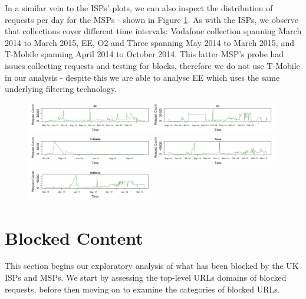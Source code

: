 \documentclass{bmcart}
\begin{document}
In a similar vein to the ISPs' plots, we can also inspect the distribution of requests per day for the MSPs - shown in Figure \ref{fig:mobile-requests}.
As with the ISPs, we observe that collections cover different time intervals: Vodafone collection spanning March 2014 to March 2015, EE, O2 and Three spanning May 2014 to March 2015, and T-Mobile spanning April 2014 to October 2014.
This latter MSP's probe had issues collecting requests and testing for blocks, therefore we do not use T-Mobile in our analysis - despite this we are able to analyse EE which uses the same underlying filtering technology.

\begin{figure}[h!]
\caption{}
\includegraphics[width=0.49\textwidth]{imgs/EE-ts-requests.pdf}\includegraphics[width=0.49\textwidth]{imgs/O2-ts-requests.pdf}
\includegraphics[width=0.49\textwidth]{imgs/T-Mobile-ts-requests.pdf}\includegraphics[width=0.49\textwidth]{imgs/Three-ts-requests.pdf}
\includegraphics[width=0.49\textwidth]{imgs/Vodafone-ts-requests.pdf}
\label{fig:mobile-requests}
\end{figure}


\clearpage
\section*{Blocked Content}
This section begins our exploratory analysis of what has been blocked by the UK ISPs and MSPs.
We start by assessing the top-level URLs domains of blocked requests, before then moving on to examine the categories of blocked URLs.
\end{document}
